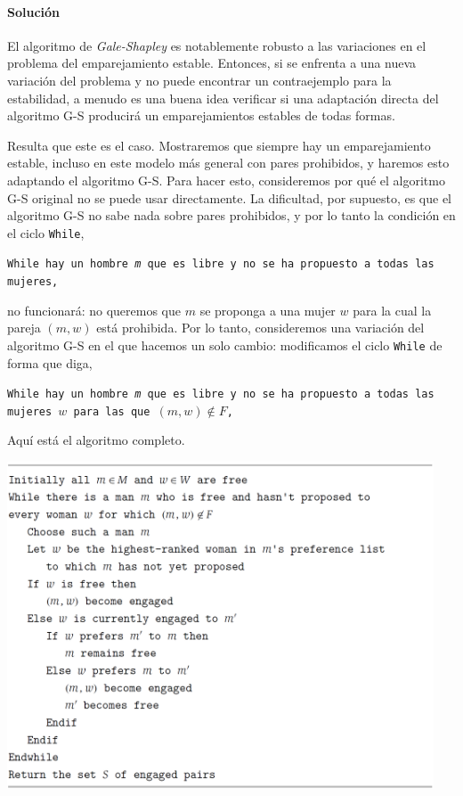 \documentclass[a4paper, 12pt]{book}
\theoremstyle{dotless}
\begin{document}
\paragraph{Solución} El algoritmo de \textit{Gale-Shapley} es notablemente robusto a las variaciones en el problema del emparejamiento estable. Entonces, si se enfrenta a una nueva variación del problema y no puede encontrar un contraejemplo para la estabilidad, a menudo es una buena idea verificar si una adaptación directa del algoritmo G-S producirá un emparejamientos estables de todas formas.

Resulta que este es el caso. Mostraremos que siempre hay un emparejamiento estable, incluso en este modelo más general con pares prohibidos, y haremos esto adaptando el algoritmo G-S. Para hacer esto, consideremos por qué el algoritmo G-S original no se puede usar directamente. La dificultad, por supuesto, es que el algoritmo G-S no sabe nada sobre pares prohibidos, y por lo tanto la condición en el ciclo \texttt{While},

\texttt{While hay un hombre \textit{m} que es libre y no se ha propuesto a todas las mujeres,}

\noindent no funcionará: no queremos que $m$ se proponga a una mujer $w$ para la cual la pareja $(m,w)$ está prohibida. Por lo tanto, consideremos una variación del algoritmo G-S en el que hacemos un solo cambio: modificamos el ciclo \texttt{While} de forma que diga,

\texttt{While hay un hombre \textit{m} que es libre y no se ha propuesto a todas las mujeres $w$ para las que $(m,w) \notin F$,}

Aquí está el algoritmo completo.

\includegraphics[width=0.95\textwidth]{Imagenes-Seccion1/cod1-1.PNG}
\end{document}
